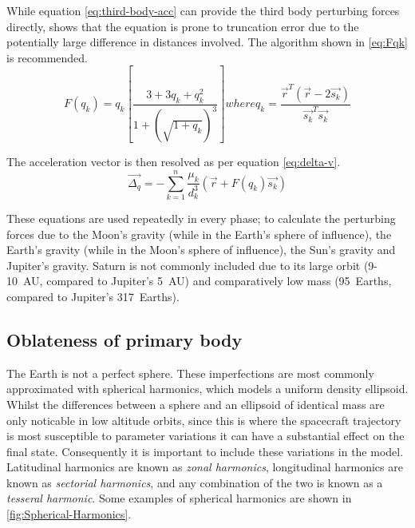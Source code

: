 While equation \eqref{eq:third-body-acc} can provide the third body perturbing forces directly, \textcite{Battin1999} shows that the equation is prone to truncation error due to the potentially large difference in distances involved. The algorithm shown in \eqref{eq:Fqk} is recommended.
\begin{subequations}
\begin{equation} \label{eq:Fqk}
F(q_k) = q_k\left[ \frac{3+3q_{k}+q_{k}^{2}}{1+(\sqrt{1+q_{k}})^{3}} \right] 
\end{equation} 
where
\begin{equation}
q_k = \frac{\vec{r}^{T}(\vec{r}-2\vec{s_{k}})}{\vec{s_k}^{T}\vec{s_k}}
\end{equation}
\end{subequations}

The acceleration vector is then resolved as per equation \eqref{eq:delta-v}.
\begin{equation}\label{eq:delta-v}
\vec{\Delta_q} = -\sum_{k=1}^{n}\frac{\mu_{k}}{d_{k}^{3}}(\vec{r}+F(q_{k})\vec{s_{k}})
\end{equation}

These equations are used repeatedly in every phase; to calculate the perturbing forces due to the Moon's gravity (while in the Earth's sphere of influence), the Earth's gravity (while in the Moon's sphere of influence), the Sun's gravity and Jupiter's gravity. Saturn is not commonly included due to its large orbit (9-10~AU, compared to Jupiter's 5~AU) and comparatively low mass (95~Earths, compared to Jupiter's 317~Earths).



\subsection{Oblateness of primary body} \label{sub:Oblateness}

The Earth is not a perfect sphere. These imperfections are most commonly approximated with spherical harmonics, which models a uniform density ellipsoid. Whilst the differences between a sphere and an ellipsoid of identical mass are only noticable in low altitude orbits, since this is where the spacecraft trajectory is most susceptible to parameter variations it can have a substantial effect on the final state. Consequently it is important to include these variations in the model. Latitudinal harmonics are known as \emph{zonal harmonics}, longitudinal harmonics are known as \emph{sectorial harmonics}, and any combination of the two is known as a \emph{tesseral harmonic}. Some examples of spherical harmonics are shown in \autoref{fig:Spherical-Harmonics}.

